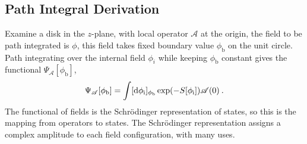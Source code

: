 \subsection*{Path Integral Derivation}
Examine a disk in the $z$-plane, with local operator $\mathscr{A}$ at the origin, the field to be path integrated is $\phi$, this field takes fixed boundary value $\phi_{\mathrm{b}}$ on the unit circle.    
Path integrating over the internal field $\phi_i$ while keeping $\phi_{\mathrm{b}}$ constant gives the functional $\Psi_{\mathscr{A}}[\phi_{\mathrm{b}}]$,    
\begin{equation}
	\Psi_{\mathscr{A}}[\phi_{\mathrm{b}}]= \int[\mathrm{d}  \phi_{\mathrm{i}}]_{\phi_{\mathrm{b}}} 
	\exp (-S[\phi_{\mathrm{i}}]) \mathscr{A}(0) \:. \label{2.8.17}
\end{equation}
The functional of fields is the Schrödinger representation of states, so this is the mapping from operators to states. The Schrödinger representation assigns a complex amplitude to each field configuration, with many uses.    

